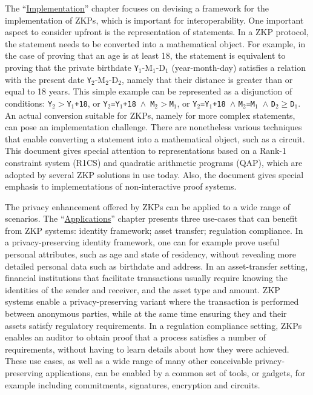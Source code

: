 The ``\hyperref[chap:implem]{Implementation}'' chapter focuses on devising a framework for the implementation of ZKPs, which is important for interoperability.
One important aspect to consider upfront is the representation of statements.
In a ZKP protocol, the statement needs to be converted into a mathematical object.
For example, in the case of proving that an age is at least 18, the statement is equivalent to proving that the private birthdate {\texttt Y$_1$-M$_1$-D$_1$} (year-month-day) satisfies a relation with the present date {\texttt Y$_2$-M$_2$-D$_2$}, namely that their distance is greater than or equal to 18 years.
This simple example can be represented as a disjunction of conditions: 
    {\tt Y$_2>$Y$_1$+18}, 
    or {\tt Y$_2$=Y$_1$+18}~$\wedge$~{\tt M$_2$}$>${\tt M$_1$},
    or {\tt Y$_2$=Y$_1$+18 }$\wedge${ \tt M$_2$=M$_1$ }$\wedge${ \tt D$_2$}$\geq${\tt D$_1$}.
An actual conversion suitable for ZKPs, namely for more complex statements, can pose an implementation challenge. 
There are nonetheless various techniques that enable converting a statement into a mathematical object, such as a circuit.
This document gives special attention to representations based on a Rank-1 constraint system (R1CS) and quadratic arithmetic programs (QAP), which are adopted by several ZKP solutions in use today.
Also, the document gives special emphasis to implementations of non-interactive proof systems.
\loosen


The privacy enhancement offered by ZKPs can be applied to a wide range of scenarios.  
The ``\hyperref[chap:apps]{Applications}'' chapter presents three use-cases that can benefit from ZKP systems: identity framework; asset transfer; regulation compliance. 
In a privacy-preserving identity framework, one can for example prove useful personal attributes, such as age and state of residency, without revealing more detailed personal data such as birthdate and address.
In an asset-transfer setting, financial institutions that facilitate transactions usually require knowing the identities of the sender and receiver, and the asset type and amount. 
ZKP systems enable a privacy-preserving variant where the transaction is performed between anonymous parties, while at the same time ensuring they and their assets satisfy regulatory requirements.
In a regulation compliance setting, ZKPs enables an auditor to obtain proof that a process satisfies a number of requirements, without having to learn details about how they were achieved.
These use cases, as well as a wide range of many other conceivable privacy-preserving applications, can be enabled by a common set of tools, or gadgets, for example including commitments, signatures, encryption and circuits.
\loosen


